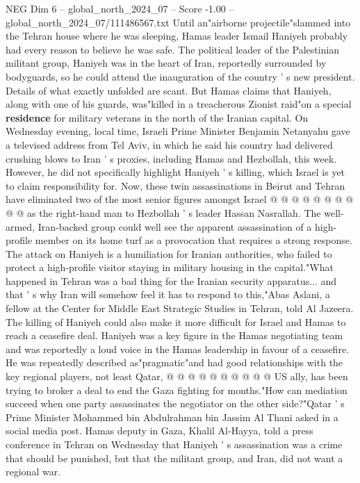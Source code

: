 \begin{textsample}{NEG Dim 6 – global\_north\_2024\_07 – Score -1.00 – global\_north\_2024\_07/111486567.txt}  \label{ex:f6_neg_225}
Until an"airborne projectile"slammed into the Tehran house where he was sleeping, Hamas leader Ismail Haniyeh probably had every reason to believe he was safe.
The political leader of the Palestinian militant group, Haniyeh was in the heart of Iran, reportedly surrounded by bodyguards, so he could attend the inauguration of the country ' s new president.
Details of what exactly unfolded are scant.
But Hamas claims that Haniyeh, along with one of his guards, was"killed in a treacherous Zionist raid"on a special \textbf{residence} for military veterans in the north of the Iranian capital.
On Wednesday evening, local time, Israeli Prime Minister Benjamin Netanyahu gave a televised address from Tel Aviv, in which he said his country had delivered crushing blows to Iran ' s proxies, including Hamas and Hezbollah, this week.
However, he did not specifically highlight Haniyeh ' s killing, which Israel is yet to claim responsibility for.
Now, these twin assassinations in Beirut and Tehran have eliminated two of the most senior figures amongst Israel @ @ @ @ @ @ @ @ @ @ as the right-hand man to Hezbollah ' s leader Hassan Nasrallah.
The well-armed, Iran-backed group could well see the apparent assassination of a high-profile member on its home turf as a provocation that requires a strong response.
The attack on Haniyeh is a humiliation for Iranian authorities, who failed to protect a high-profile visitor staying in military housing in the capital."What happened in Tehran was a bad thing for the Iranian security apparatus... and that ' s why Iran will somehow feel it has to respond to this,"Abas Aslani, a fellow at the Center for Middle East Strategic Studies in Tehran, told Al Jazeera.
The killing of Haniyeh could also make it more difficult for Israel and Hamas to reach a ceasefire deal.
Haniyeh was a key figure in the Hamas negotiating team and was reportedly a loud voice in the Hamas leadership in favour of a ceasefire.
He was repeatedly described as"pragmatic"and had good relationships with the key regional players, not least Qatar, @ @ @ @ @ @ @ @ @ @ US ally, has been trying to broker a deal to end the Gaza fighting for months."How can mediation succeed when one party assassinates the negotiator on the other side?"Qatar ' s Prime Minister Mohammed bin Abdulrahman bin Jassim Al Thani asked in a social media post.
Hamas deputy in Gaza, Khalil Al-Hayya, told a press conference in Tehran on Wednesday that Haniyeh ' s assassination was a crime that should be punished, but that the militant group, and Iran, did not want a regional war.

\end{textsample}
